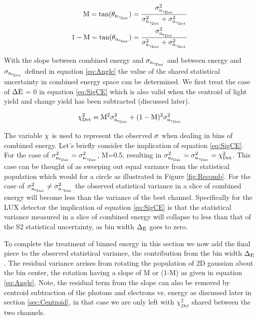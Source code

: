 \begin{equation}
\begin{split}
\rm M = tan(\theta_{n_{\gamma_{Det}}})=\frac{\sigma_{n_{\gamma_{Det}}}^2}{\sigma_{n_{\gamma_{Det}}}^2+ \sigma_{n_{\gamma_{Det}}}^2} \\
\rm 1-M = tan(\theta_{n_{e_{Det}}})=\frac{\sigma_{n_{e_{Det}}}^2}{\sigma_{n_{\gamma_{Det}}}^2+ \sigma_{n_{\gamma_{Det}}}^2} 
\label{eq:Angle}
\end{split}
\end{equation}


With the slope between combined energy and $\rm \sigma_{n_{\gamma_{Det}}}$ and between energy and $\rm \sigma_{n_{e_{Det}}}$ defined in equation \ref{eq:Angle} the value of the shared statistical uncertainty in combined energy space can be determined. We first treat the case of $\rm \Delta E$ = 0 in equation \ref{eq:SigCE} which is also valid when the centroid of light yield and change yield has been subtracted (discussed later).

\begin{equation}
\rm \chi_{Det}^2= M^2\sigma_{n_{e_{Det}}}^2 + (1-M)^2\sigma_{n_{\gamma_{Det}}}^2
\label{eq:SigCE}
\end{equation}


The variable $\rm \chi$ is used to represent the observed $\rm \sigma$ when dealing in bins of combined energy. Let's briefly consider the implication of equation \ref{eq:SigCE}. For the case of $\rm \sigma_{n_{e_{Det}}}^2 = \sigma_{n_{\gamma_{Det}}}^2$, M=0.5, resulting in $\rm \sigma_{n_{e_{Det}}}^2=\sigma_{n_{\gamma_{Det}}}^2= \chi_{Det}^2$. This case can be thought of as sweeping out equal variance from the statistical population which would for a circle as illustrated in Figure \ref{fig:Recomb}. For the case of $\rm \sigma_{n_{e_{Det}}}^2 \neq \sigma_{n_{\gamma_{Det}}}^2$ the observed statistical variance in a slice of combined energy will become less than the variance of the best channel. Specifically for the LUX detector the implication of equation \ref{eq:SigCE} is that the statistical variance measured in a slice of combined energy will collapse to less than that of the S2 statistical uncertainty, as bin width $\rm \Delta_E$ goes to zero.


To complete the treatment of binned energy in this section we now add the final piece to the observed statistical variance, the contribution from the bin width $\rm \Delta_E$. The residual variance arrises from rotating the population of 2D gaussian about the bin center, the rotation having a slope of M or (1-M) as given in equation \ref{eq:Angle}. Note, the residual term from the slope can also be removed by centroid subtraction of the photons and electrons vs. energy as discussed later in section \ref{sec:Centroid}, in that case we are only left with $\chi_{Det}^2$ shared between the two channels.


